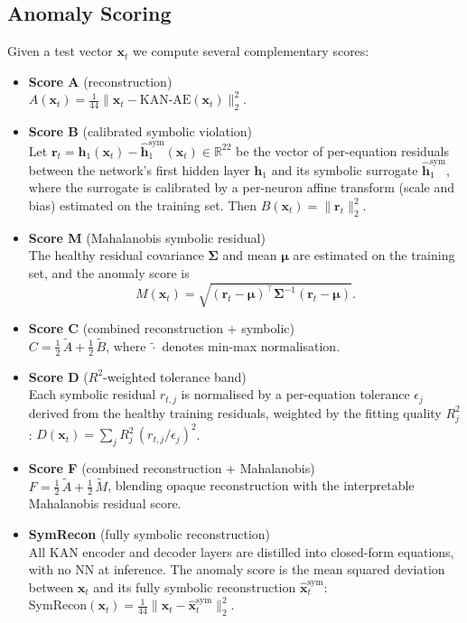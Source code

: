 \documentclass[conference]{IEEEtran}
\begin{document}
\subsection{Anomaly Scoring}
Given a test vector $\mathbf{x}_t$ we compute several
complementary scores:
\begin{itemize}
\item \textbf{Score A} (reconstruction) \\
$A(\mathbf{x}_t)= \frac{1}{44}\|\mathbf{x}_t
       - \text{KAN-AE}(\mathbf{x}_t)\|_2^2$.
\item \textbf{Score B} (calibrated symbolic violation) \\
Let
$\mathbf{r}_t = \mathbf{h}_1(\mathbf{x}_t)-
\hat{\mathbf{h}}_1^{\text{sym}}(\mathbf{x}_t)\in\mathbb{R}^{22}$
be the vector of per-equation residuals between the network's
first hidden layer $\mathbf{h}_1$ and its symbolic surrogate
$\hat{\mathbf{h}}_1^{\text{sym}}$, where the surrogate
is calibrated by a per-neuron affine transform (scale and bias)
estimated on the training set. Then
$B(\mathbf{x}_t) = \|\mathbf{r}_t\|_2^2$.
\item \textbf{Score M} (Mahalanobis symbolic residual) \\
The healthy residual
covariance $\mathbf{\Sigma}$ and mean $\boldsymbol{\mu}$ are
estimated on the training set, and the anomaly score is
\begin{equation}
M(\mathbf{x}_t) = \sqrt{(\mathbf{r}_t-\boldsymbol{\mu})^\top
                   \mathbf{\Sigma}^{-1}
                   (\mathbf{r}_t-\boldsymbol{\mu})}.
\label{eq:mahal}
\end{equation}
\item \textbf{Score C} (combined reconstruction + symbolic) \\
$C = \tfrac{1}{2}\,\widetilde{A} + \tfrac{1}{2}\,\widetilde{B}$,
where $\widetilde{\cdot}$ denotes min-max normalisation.
\item \textbf{Score D} ($R^2$-weighted tolerance band) \\
Each symbolic residual $r_{t,j}$ is normalised by a per-equation
tolerance $\epsilon_j$ derived from the healthy training residuals,
weighted by the fitting quality $R^2_j$:
$D(\mathbf{x}_t) = \sum_j R^2_j\,(r_{t,j}/\epsilon_j)^2$.
\item \textbf{Score F} (combined reconstruction + Mahalanobis) \\
$F = \tfrac{1}{2}\,\widetilde{A} + \tfrac{1}{2}\,\widetilde{M}$,
blending opaque reconstruction with the interpretable
Mahalanobis residual score.
\item \textbf{SymRecon} (fully symbolic reconstruction) \\
All KAN encoder and decoder layers are distilled into closed-form
equations, with no NN at inference. The
anomaly score is the mean squared deviation between $\mathbf{x}_t$ and its
fully symbolic reconstruction $\hat{\mathbf{x}}^{\text{sym}}_t$:
$\text{SymRecon}(\mathbf{x}_t)=\frac{1}{44}\|\mathbf{x}_t-\hat{\mathbf{x}}^{\text{sym}}_t\|_2^2$.
\end{itemize}
\end{document}
